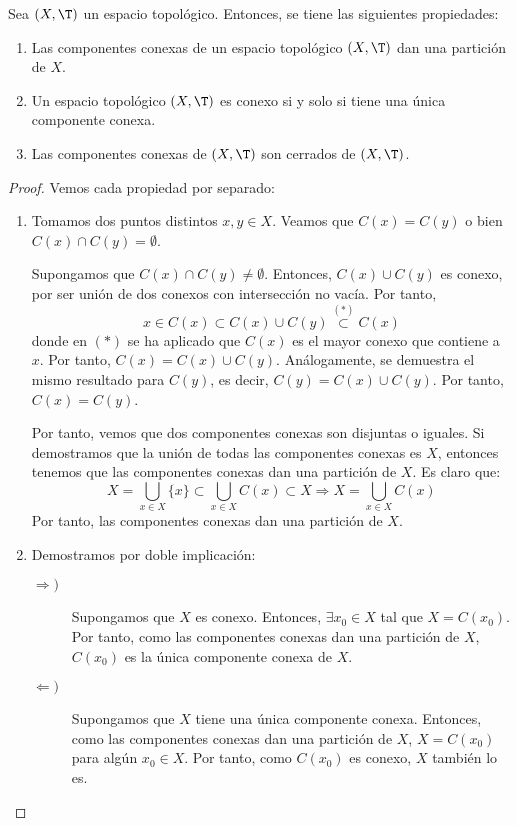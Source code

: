 \begin{prop} \label{prop:PropiedadesComponentesConexas}
    Sea $(X,\T)$ un espacio topológico. Entonces, se tiene las siguientes propiedades:
    \begin{enumerate}
        \item Las componentes conexas de un espacio topológico $(X,\T)$ dan una partición de $X$.
        \item Un espacio topológico $(X,\T)$ es conexo si y solo si tiene una única componente conexa.
        \item Las componentes conexas de $(X,\T)$ son cerrados de $(X,\T)$.
    \end{enumerate}
\end{prop}
\begin{proof} Vemos cada propiedad por separado:
    \begin{enumerate}
        \item Tomamos dos puntos distintos $x,y\in X$. Veamos que $C(x)=C(y)$ o bien $C(x)\cap C(y)=\emptyset$.

        Supongamos que $C(x)\cap C(y)\neq \emptyset$. Entonces, $C(x)\cup C(y)$ es conexo, por ser unión de dos conexos con intersección no vacía. Por tanto,
        \begin{equation*}
            x\in C(x)\subset C(x)\cup C(y) \stackrel{(\ast)}{\subset} C(x)
        \end{equation*}
        donde en $(\ast)$ se ha aplicado que $C(x)$ es el mayor conexo que contiene a $x$. Por tanto, $C(x)=C(x)\cup C(y)$. Análogamente, se demuestra el mismo resultado para $C(y)$, es decir, $C(y)=C(x)\cup C(y)$. Por tanto, $C(x)=C(y)$.
        
        Por tanto, vemos que dos componentes conexas son disjuntas o iguales. Si demostramos que la unión de todas las componentes conexas es $X$, entonces tenemos que las componentes conexas dan una partición de $X$.
        Es claro que:
        \begin{equation*}
            X=\bigcup_{x\in X}\{x\} \subset \bigcup_{x\in X}C(x)\subset X \Longrightarrow X=\bigcup_{x\in X}C(x)
        \end{equation*}
        Por tanto, las componentes conexas dan una partición de $X$.

        \item Demostramos por doble implicación:
        \begin{description}
            \item[$\Longrightarrow)$] Supongamos que $X$ es conexo. Entonces, $\exists x_0\in X$ tal que $X=C(x_0)$. Por tanto, como las componentes conexas dan una partición de $X$, $C(x_0)$ es la única componente conexa de $X$.
            \item[$\Longleftarrow)$] Supongamos que $X$ tiene una única componente conexa. Entonces, como las componentes conexas dan una partición de $X$, $X=C(x_0)$ para algún $x_0\in X$. Por tanto, como $C(x_0)$ es conexo, $X$ también lo es.
        \end{description}


\end{enumerate}
\end{proof}
